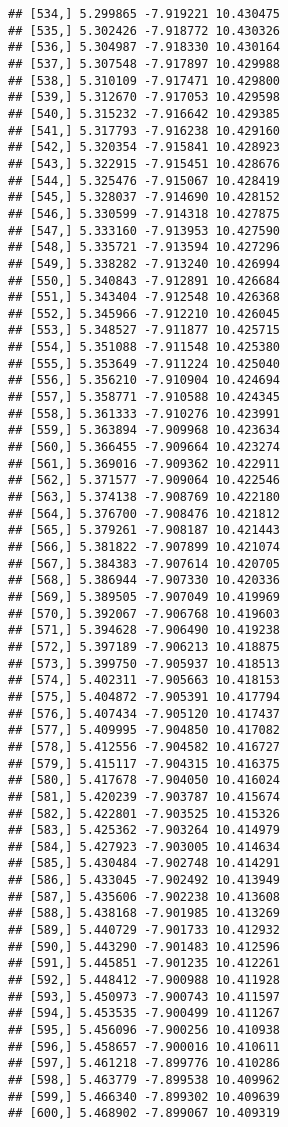 \documentclass[]{book}
\theoremstyle{definition}
\theoremstyle{definition}
\theoremstyle{definition}
\theoremstyle{remark}
\begin{document}
\begin{verbatim}
## [534,] 5.299865 -7.919221 10.430475
## [535,] 5.302426 -7.918772 10.430326
## [536,] 5.304987 -7.918330 10.430164
## [537,] 5.307548 -7.917897 10.429988
## [538,] 5.310109 -7.917471 10.429800
## [539,] 5.312670 -7.917053 10.429598
## [540,] 5.315232 -7.916642 10.429385
## [541,] 5.317793 -7.916238 10.429160
## [542,] 5.320354 -7.915841 10.428923
## [543,] 5.322915 -7.915451 10.428676
## [544,] 5.325476 -7.915067 10.428419
## [545,] 5.328037 -7.914690 10.428152
## [546,] 5.330599 -7.914318 10.427875
## [547,] 5.333160 -7.913953 10.427590
## [548,] 5.335721 -7.913594 10.427296
## [549,] 5.338282 -7.913240 10.426994
## [550,] 5.340843 -7.912891 10.426684
## [551,] 5.343404 -7.912548 10.426368
## [552,] 5.345966 -7.912210 10.426045
## [553,] 5.348527 -7.911877 10.425715
## [554,] 5.351088 -7.911548 10.425380
## [555,] 5.353649 -7.911224 10.425040
## [556,] 5.356210 -7.910904 10.424694
## [557,] 5.358771 -7.910588 10.424345
## [558,] 5.361333 -7.910276 10.423991
## [559,] 5.363894 -7.909968 10.423634
## [560,] 5.366455 -7.909664 10.423274
## [561,] 5.369016 -7.909362 10.422911
## [562,] 5.371577 -7.909064 10.422546
## [563,] 5.374138 -7.908769 10.422180
## [564,] 5.376700 -7.908476 10.421812
## [565,] 5.379261 -7.908187 10.421443
## [566,] 5.381822 -7.907899 10.421074
## [567,] 5.384383 -7.907614 10.420705
## [568,] 5.386944 -7.907330 10.420336
## [569,] 5.389505 -7.907049 10.419969
## [570,] 5.392067 -7.906768 10.419603
## [571,] 5.394628 -7.906490 10.419238
## [572,] 5.397189 -7.906213 10.418875
## [573,] 5.399750 -7.905937 10.418513
## [574,] 5.402311 -7.905663 10.418153
## [575,] 5.404872 -7.905391 10.417794
## [576,] 5.407434 -7.905120 10.417437
## [577,] 5.409995 -7.904850 10.417082
## [578,] 5.412556 -7.904582 10.416727
## [579,] 5.415117 -7.904315 10.416375
## [580,] 5.417678 -7.904050 10.416024
## [581,] 5.420239 -7.903787 10.415674
## [582,] 5.422801 -7.903525 10.415326
## [583,] 5.425362 -7.903264 10.414979
## [584,] 5.427923 -7.903005 10.414634
## [585,] 5.430484 -7.902748 10.414291
## [586,] 5.433045 -7.902492 10.413949
## [587,] 5.435606 -7.902238 10.413608
## [588,] 5.438168 -7.901985 10.413269
## [589,] 5.440729 -7.901733 10.412932
## [590,] 5.443290 -7.901483 10.412596
## [591,] 5.445851 -7.901235 10.412261
## [592,] 5.448412 -7.900988 10.411928
## [593,] 5.450973 -7.900743 10.411597
## [594,] 5.453535 -7.900499 10.411267
## [595,] 5.456096 -7.900256 10.410938
## [596,] 5.458657 -7.900016 10.410611
## [597,] 5.461218 -7.899776 10.410286
## [598,] 5.463779 -7.899538 10.409962
## [599,] 5.466340 -7.899302 10.409639
## [600,] 5.468902 -7.899067 10.409319
\end{verbatim}
\end{document}
